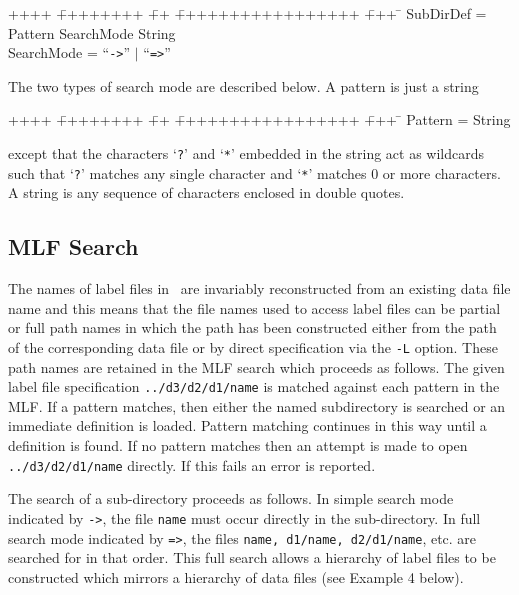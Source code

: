 {\sf
\begin{tabbing}
++++ \= ++++++++ \= ++ \= +++++++++++++++++ \= +++ \=  \kill
\>   SubDirDef = \> Pattern SearchMode String \\
\>   SearchMode = \> ``\verb+->+'' $|$ ``\verb+=>+''
\end{tabbing}
}
\noindent
The two types of search mode are described below. A pattern is just a 
string
{\sf
\begin{tabbing}
++++ \= ++++++++ \= ++ \= +++++++++++++++++ \= +++ \=  \kill
\>    Pattern = \> String
\end{tabbing}
}
\noindent
except that the characters `\texttt{?}' and `\texttt{*}' embedded in the string act
as wildcards such that `\texttt{?}' matches any single character and
`\texttt{*}' matches 0 or more characters.
A string is any sequence of characters enclosed in double quotes.

\subsection{MLF Search}

The names of label files in \HTK\ are invariably reconstructed from an
existing data file name and this means that the
file names used to access label files can be partial or full path names in which
the path has been constructed either from the path of the corresponding
data file or by direct specification via the {\tt -L} option.  These
path names are retained in the MLF search which proceeds as follows.
The given label file specification \texttt{../d3/d2/d1/name} is matched
against each pattern in the MLF.  If a pattern matches, then either the
named subdirectory is searched or an immediate definition is loaded.
Pattern matching continues in this way until a definition is found.  If
no pattern matches then an attempt is made to open \texttt{../d3/d2/d1/name}
directly.  If this fails an error is reported.

The search of a sub-directory proceeds as follows.  In simple search
mode indicated by  \texttt{->}, the file \texttt{name} must occur directly in the
sub-directory.  In full search mode indicated by \texttt{=>}, the files
\texttt{name, d1/name, d2/d1/name}, etc. are searched for in that order.
This full search allows a hierarchy of label files to be constructed
which mirrors a hierarchy of data files (see Example 4 below).
   
